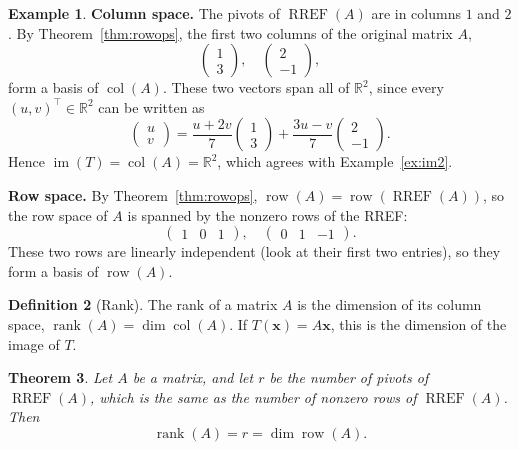 \documentclass[11pt]{article}
\theoremstyle{definition}
\newtheorem{definition}{Definition}[section]
\newtheorem{example}[definition]{Example}
\theoremstyle{plain}
\newtheorem{theorem}[definition]{Theorem}
\theoremstyle{remark}
\DeclareMathOperator{\im}{im}
\DeclareMathOperator{\rank}{rank}
\DeclareMathOperator{\col}{col}
\DeclareMathOperator{\row}{row}
\DeclareMathOperator{\RREF}{RREF}
\begin{document}
\begin{example}
    \textbf{Column space.} The pivots of $\RREF(A)$ are in columns $1$ and $2$. By Theorem~\ref{thm:rowops}, the first two columns of the original matrix $A$,
    \[\begin{pmatrix}
        1 \\
        3
    \end{pmatrix}, \quad
    \begin{pmatrix}
        2 \\
        -1
    \end{pmatrix},\]
    form a basis of $\col(A)$. These two vectors span all of $\mathbb{R}^2$, since every $(u, v)^\top \in \mathbb{R}^2$ can be written as
    \[\begin{pmatrix}
        u \\
        v
    \end{pmatrix} = \frac{u + 2v}{7} \begin{pmatrix}
        1 \\
        3
    \end{pmatrix} + \frac{3u - v}{7} \begin{pmatrix}
        2 \\
        -1
    \end{pmatrix}.\]
    Hence $\im(T) = \col(A) = \mathbb{R}^2$, which agrees with Example~\ref{ex:im2}.

    \textbf{Row space.} By Theorem~\ref{thm:rowops}, $\row(A) = \row(\RREF(A))$, so the row space of $A$ is spanned by the nonzero rows of the RREF:
    \[\begin{pmatrix}
        1 & 0 & 1
    \end{pmatrix}, \quad
    \begin{pmatrix}
        0 & 1 & -1
    \end{pmatrix}.\]
    These two rows are linearly independent (look at their first two entries), so they form a basis of $\row(A)$.
\end{example}

\begin{definition}[Rank]
    The rank of a matrix $A$ is the dimension of its column space, $\rank(A) = \dim \col(A)$. If $T(\mathbf{x}) = A\mathbf{x}$, this is the dimension of the image of $T$.
\end{definition}

\begin{theorem}\label{thm:rank}
    Let $A$ be a matrix, and let $r$ be the number of pivots of $\RREF(A)$, which is the same as the number of nonzero rows of $\RREF(A)$. Then
    \[\rank(A) = r = \dim \row(A).\]
\end{theorem}
\end{document}
